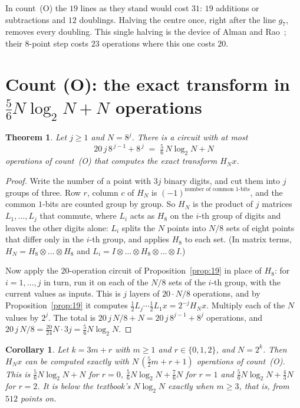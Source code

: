 \documentclass[10pt]{article}
\newtheorem{theorem}{Theorem}
\newtheorem{corollary}[proposition]{Corollary}
\theoremstyle{remark}
\newcommand{\cntO}{\textup{(O)}}
\renewcommand{\lg}{\log_2}
\begin{document}
In count~\cntO{} the $19$ lines as they stand would cost $31$: $19$ additions or subtractions and $12$
doublings. Halving the centre once, right after the line $g_7$, removes every doubling. This single halving
is the device of Alman and Rao~\cite{AR}; their $8$-point step costs $23$ operations where this one costs $20$.

\section{Count \cntO: the exact transform in \texorpdfstring{$\tfrac56N\lg N+N$}{(5/6) N log N + N} operations}\label{sec:A}

\begin{theorem}\label{thm:A}
Let $j\ge 1$ and $N=8^j$. There is a circuit with at most
\[
20\,j\,8^{\,j-1}+8^{\,j}\;=\;\tfrac56\,N\lg N+N
\]
operations of count~\cntO{} that computes the exact transform $H_N x$.
\end{theorem}

\begin{proof}
Write the number of a point with $3j$ binary digits, and cut them into $j$ groups of three. Row $r$,
column $c$ of $H_N$ is $(-1)^{\text{number of common $1$-bits}}$, and the common $1$-bits are counted group
by group. So $H_N$ is the product of $j$ matrices $L_1,\dots,L_j$ that commute, where $L_i$ acts as $H_8$ on
the $i$-th group of digits and leaves the other digits alone: $L_i$ splits the $N$ points into $N/8$ sets of
eight points that differ only in the $i$-th group, and applies $H_8$ to each set. (In matrix terms,
$H_N=H_8\otimes\dots\otimes H_8$ and $L_i=I\otimes\dots\otimes H_8\otimes\dots\otimes I$.)

Now apply the $20$-operation circuit of Proposition~\ref{prop:19} in place of $H_8$: for $i=1,\dots,j$ in turn,
run it on each of the $N/8$ sets of the $i$-th group, with the current values as inputs. This is $j$ layers of
$20\cdot N/8$ operations, and by Proposition~\ref{prop:19} it computes
$\tfrac12L_j\cdots\tfrac12L_1x=2^{-j}H_Nx$. Multiply each of the $N$ values by $2^{j}$. The total is
$20\,j\,N/8+N=20\,j\,8^{j-1}+8^{j}$ operations, and $20\,j\,N/8=\tfrac{20}{24}N\cdot 3j=\tfrac56N\lg N$.
\end{proof}

\begin{corollary}\label{cor:allk}
Let $k=3m+r$ with $m\ge1$ and $r\in\{0,1,2\}$, and $N=2^k$. Then $H_Nx$ can be computed exactly with
$N\,(\tfrac52m+r+1)$ operations of count~\cntO. This is $\tfrac56N\lg N+N$ for $r=0$,
$\tfrac56N\lg N+\tfrac76N$ for $r=1$ and $\tfrac56N\lg N+\tfrac43N$ for $r=2$. It is below the textbook's
$N\lg N$ exactly when $m\ge 3$, that is, from $512$ points on.
\end{corollary}
\end{document}
